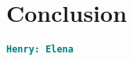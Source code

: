 \documentclass[12pt]{article}
\newcommand{\comment}[1]{{\bf \tt  {#1}}}
\newcommand{\hfcomment}[1]{\textcolor{Teal}{\comment{Henry: {#1}}}}
\begin{document}
\section{Conclusion}\label{sec:conclusion}
	\hfcomment{Elena}




\end{document}
